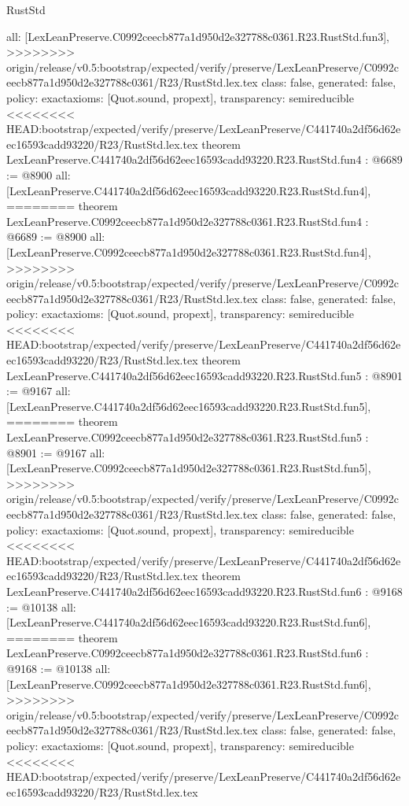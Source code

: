 \begin{lexlean}{RustStd}
\begin{coremodule}
{\begin{coremodule}
{{{{{{{  all: [LexLeanPreserve.C0992ceecb877a1d950d2e327788c0361.R23.RustStd.fun3],
>>>>>>>> origin/release/v0.5:bootstrap/expected/verify/preserve/LexLeanPreserve/C0992ceecb877a1d950d2e327788c0361/R23/RustStd.lex.tex
  class: false,
  generated: false,
  policy: exact{axioms: [Quot.sound, propext]},
  transparency: semireducible
}
<<<<<<<< HEAD:bootstrap/expected/verify/preserve/LexLeanPreserve/C441740a2df56d62eec16593cadd93220/R23/RustStd.lex.tex
theorem LexLeanPreserve.C441740a2df56d62eec16593cadd93220.R23.RustStd.fun4 : @6689 := @8900 {
  all: [LexLeanPreserve.C441740a2df56d62eec16593cadd93220.R23.RustStd.fun4],
========
theorem LexLeanPreserve.C0992ceecb877a1d950d2e327788c0361.R23.RustStd.fun4 : @6689 := @8900 {
  all: [LexLeanPreserve.C0992ceecb877a1d950d2e327788c0361.R23.RustStd.fun4],
>>>>>>>> origin/release/v0.5:bootstrap/expected/verify/preserve/LexLeanPreserve/C0992ceecb877a1d950d2e327788c0361/R23/RustStd.lex.tex
  class: false,
  generated: false,
  policy: exact{axioms: [Quot.sound, propext]},
  transparency: semireducible
}
<<<<<<<< HEAD:bootstrap/expected/verify/preserve/LexLeanPreserve/C441740a2df56d62eec16593cadd93220/R23/RustStd.lex.tex
theorem LexLeanPreserve.C441740a2df56d62eec16593cadd93220.R23.RustStd.fun5 : @8901 := @9167 {
  all: [LexLeanPreserve.C441740a2df56d62eec16593cadd93220.R23.RustStd.fun5],
========
theorem LexLeanPreserve.C0992ceecb877a1d950d2e327788c0361.R23.RustStd.fun5 : @8901 := @9167 {
  all: [LexLeanPreserve.C0992ceecb877a1d950d2e327788c0361.R23.RustStd.fun5],
>>>>>>>> origin/release/v0.5:bootstrap/expected/verify/preserve/LexLeanPreserve/C0992ceecb877a1d950d2e327788c0361/R23/RustStd.lex.tex
  class: false,
  generated: false,
  policy: exact{axioms: [Quot.sound, propext]},
  transparency: semireducible
}
<<<<<<<< HEAD:bootstrap/expected/verify/preserve/LexLeanPreserve/C441740a2df56d62eec16593cadd93220/R23/RustStd.lex.tex
theorem LexLeanPreserve.C441740a2df56d62eec16593cadd93220.R23.RustStd.fun6 : @9168 := @10138 {
  all: [LexLeanPreserve.C441740a2df56d62eec16593cadd93220.R23.RustStd.fun6],
========
theorem LexLeanPreserve.C0992ceecb877a1d950d2e327788c0361.R23.RustStd.fun6 : @9168 := @10138 {
  all: [LexLeanPreserve.C0992ceecb877a1d950d2e327788c0361.R23.RustStd.fun6],
>>>>>>>> origin/release/v0.5:bootstrap/expected/verify/preserve/LexLeanPreserve/C0992ceecb877a1d950d2e327788c0361/R23/RustStd.lex.tex
  class: false,
  generated: false,
  policy: exact{axioms: [Quot.sound, propext]},
  transparency: semireducible
}
<<<<<<<< HEAD:bootstrap/expected/verify/preserve/LexLeanPreserve/C441740a2df56d62eec16593cadd93220/R23/RustStd.lex.tex
}}}}}}}}}
\end{coremodule}}
\end{coremodule}
\end{lexlean}
